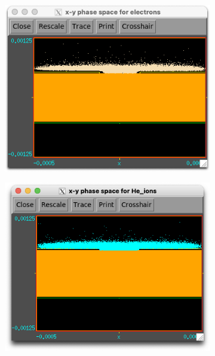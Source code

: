 \begin{figure}[h!]
    \centering
    \begin{subfigure}[b]{0.475\textwidth}
        \centering
        \includegraphics[width=\textwidth]{chapter_4/figures/SRR_no_hole_electrons.png}
        \caption{}
        \label{fig:SRR_no_hole_electrons}
    \end{subfigure}
    \hfill
    \begin{subfigure}[b]{0.475\textwidth}  
        \centering 
        \includegraphics[width=\textwidth]{chapter_4/figures/SRR_no_hole_ions.png}
        \caption{}

\end{subfigure}
\end{figure}

